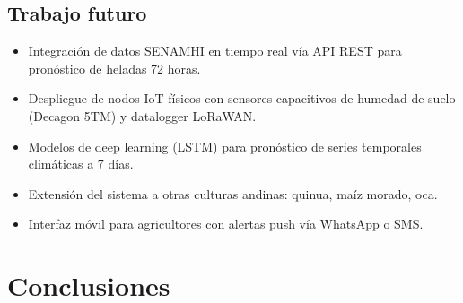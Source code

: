 \documentclass[12pt,a4paper]{article}
\begin{document}
\subsection{Trabajo futuro}

\begin{itemize}
  \item Integración de datos SENAMHI en tiempo real vía API REST para
    pronóstico de heladas 72 horas.
  \item Despliegue de nodos IoT físicos con sensores capacitivos de
    humedad de suelo (Decagon 5TM) y datalogger LoRaWAN.
  \item Modelos de deep learning (LSTM) para pronóstico de series
    temporales climáticas a 7 días.
  \item Extensión del sistema a otras culturas andinas: quinua, maíz
    morado, oca.
  \item Interfaz móvil para agricultores con alertas push vía WhatsApp
    o SMS.
\end{itemize}

\section{Conclusiones}
\end{document}
